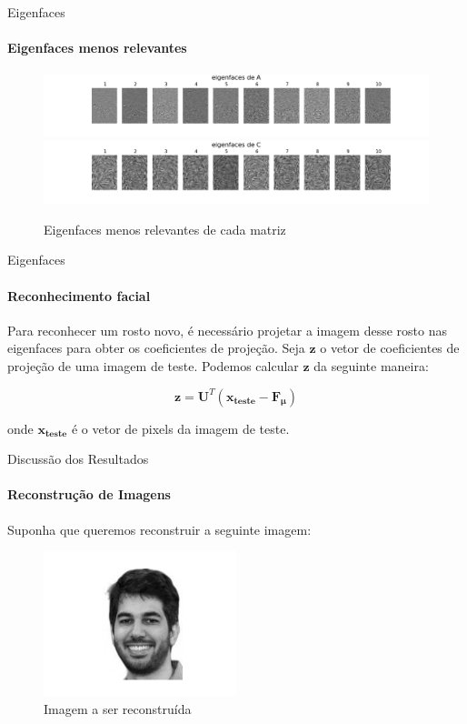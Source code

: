 \documentclass[xcolor=dvipsnames,t,aspectratio=169]{beamer} %
\begin{document}
\begin{frame}[c]{Eigenfaces}
\framesubtitle{Eigenfaces menos relevantes}

        \begin{figure}[H]
                  \centering
                  \includegraphics[width=1\textwidth]{img/MAIN_4.png}
                  \includegraphics[width=1\textwidth]{img/MAIN_5.png}
                  \caption{Eigenfaces menos relevantes de cada matriz}
                  \label{fig:exemplo}
            \end{figure}

\end{frame}

\begin{frame}[c]{Eigenfaces}
\framesubtitle{Reconhecimento facial}

         Para reconhecer um rosto novo, é necessário projetar a imagem desse rosto nas eigenfaces para obter os coeficientes de projeção. Seja $\boldsymbol{z}$ o vetor de coeficientes de projeção de uma imagem de teste. Podemos calcular $\boldsymbol{z}$ da seguinte maneira:
 
            $$
            \boldsymbol{z} = \boldsymbol{U}^{T}(\boldsymbol{x_{teste}} - \boldsymbol{F_\mu})
            $$


            onde $\boldsymbol{x_{teste}}$ é o vetor de pixels da imagem de teste.

\end{frame}


\begin{frame}[c]{Discussão dos Resultados}
\framesubtitle{Reconstrução de Imagens}

    Suponha que queremos reconstruir a seguinte imagem:

        \begin{figure}[H]
                  \centering
                  \includegraphics[width=0.5\textwidth]{img/MAIN_6.png}
                  \caption{Imagem a ser reconstruída}
                  \label{fig:exemplo}
        \end{figure}
\end{frame}
\end{document}
